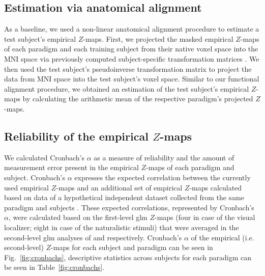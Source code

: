 \subsection{Estimation via anatomical alignment}
%
As a baseline, we used a non-linear anatomical alignment procedure to estimate
a test subject's empirical $Z$-maps.
%
First, we projected the masked empirical $Z$-maps of each paradigm and each
training subject from their native voxel space into the MNI space via previously
computed subject-specific transformation matrices
\citep[][\href{https://github.com/psychoinformatics-de/studyforrest-data-templatetransforms}{\url{github.com/psychoinformatics-de/studyforrest-data-templatetransforms}}]{hanke2014audiomovie}.
We then used the test subject's pseudoinverse transformation matrix to project
the data from MNI space into the test subject's voxel space.
Similar to our functional alignment procedure, we obtained an estimation of the
test subject's empirical $Z$-maps by calculating the arithmetic mean of the
respective paradigm's projected $Z$-maps.



\subsection{Reliability of the empirical $Z$-maps}


%
We calculated Cronbach's $\alpha$ as a measure of reliability and the amount of
measurement error \citep{cronbach1951coefficient, cortina1993coefficient}
present in the empirical $Z$-maps of each paradigm and subject.
%
Cronbach's $\alpha$ expresses the expected correlation between the currently
used empirical $Z$-maps and an additional set of empirical $Z$-maps calculated
based on data of a hypothetical independent dataset collected from the same
paradigm and subjects \citep{jiahui2020predicting, jiahui2022cross}.
%
These expected correlations, represented by Cronbach's $\alpha$, were calculated
based on the first-level \ac{glm} $Z$-maps (four in case of the visual
localizer; eight in case of the naturalistic stimuli) that were averaged in the
second-level \ac{glm} analyses of \citet{sengupta2016extension} and
\citet{haeusler2022processing} respectively.
%
Cronbach's $\alpha$ of the empirical (i.e. second-level) $Z$-maps for each
subject and paradigm can be seen in Fig.~\ref{fig:cronbachs}, descriptive
statistics across subjects for each paradigm can be seen in
Table~\ref{fig:cronbachs}.

